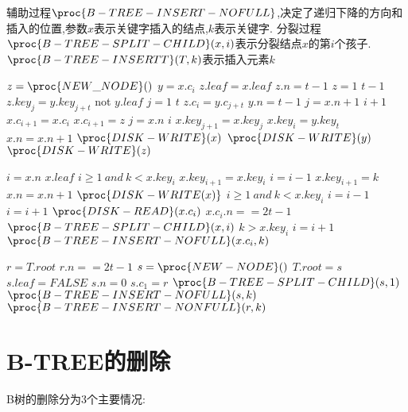 \documentclass[12pt]{article}
\begin{document}
    辅助过程$\proc{B-TREE-INSERT-NOFULL}$,决定了递归下降的方向和插入的位置,参数$x$表示关键字插入的结点,$k$表示关键字. 分裂过程$\proc{B-TREE-SPLIT-CHILD}(x,i)$表示分裂结点$x$的第$i$个孩子.$\proc{B-TREE-INSERTT}(T,k)$表示插入元素$k$
  	\begin{codebox}
  		\li $z=\proc{NEW\_NODE}()$
  		\li $y=x.c_i$
  		\li $z.leaf=x.leaf$
  		\li $z.n=t-1$
  		\li \For $z=1$ \To $t-1$
  		\li \Then $z.key_j=y.key_{j+t}$
  			\End
  		\li \If not $y.leaf$
  		\li \For $j=1$ \To $t$
  		\li \Then $z.c_i=y.c_{j+t}$
  			\End
  		\li $y.n=t-1$
  		\li \For $j=x.n+1$ \Downto $i+1$
  		\li \Then $x.c_{i+1}=x.c_{i}$
  			\End
  		\li $x.c_{i+1}=z$
  		\li \For $j=x.n$ \Downto $i$
  		\li \Then $x.key_{j+1}=x.key_j$
  			\End
  		\li $x.key_i=y.key_t$
  		\li $x.n=x.n+1$
  		\li $\proc{DISK-WRITE}(x)$
  		\li $\proc{DISK-WRITE}(y)$
  		\li $\proc{DISK-WRITE}(z)$
  	\end{codebox}
    \begin{codebox}
    	\li $i=x.n$
    	\li \If $x.leaf$
    	\li \Then \While$i\geqslant 1\ and\ k<x.key_i$
    	\li       \Then $x.key_{i+1}=x.key_{i}$
    	\li             $i=i-1$
    			  \End
    	\li       $x.key_{i+1}=k$
    	\li       $x.n=x.n+1$
    	\li       $\proc{DISK-WRITE(x)}$
    		\End
    	\li \Else \While $i\geqslant 1\ and\ k<x.key_{i}$
    	\li \Then \Then $i=i-1$
    			  \End
    	\li       $i=i+1$
    	\li 	  $\proc{DISK-READ}(x.c_i)$
    	\li		  \If $x.c_i.n==2t-1$
    	\li       \Then $\proc{B-TREE-SPLIT-CHILD}(x,i)$
    	\li             \If $k>x.key_i$
    	\li 		    \Then $i=i+1$
    					\End
    			  \End
    	\li       $\proc{B-TREE-INSERT-NOFULL}(x.c_i,k)$
    \end{codebox}
	\begin{codebox}
		\li $r=T.root$
		\li \If $r.n==2t-1$
		\li \Then $s=\proc{NEW-NODE}()$
		\li 	  $T.root=s$
		\li 	  $s.leaf=FALSE$
		\li    	  $s.n=0$
		\li       $s.c_1=r$
		\li       $\proc{B-TREE-SPLIT-CHILD}(s,1)$
		\li       $\proc{B-TREE-INSERT-NOFULL}(s,k)$
			\End 
		\li \Else $\proc{B-TREE-INSERT-NONFULL}(r,k)$
	\end{codebox}
	\section{B-TREE的删除}
	B树的删除分为3个主要情况:
	
\end{document}
